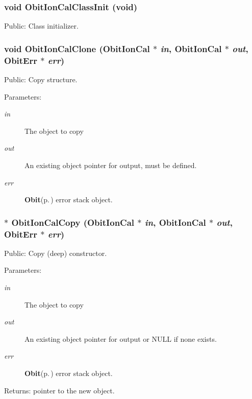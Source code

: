 \subsubsection{\setlength{\rightskip}{0pt plus 5cm}void Obit\-Ion\-Cal\-Class\-Init (void)}\label{ObitIonCal_8h_a4}


Public: Class initializer. 

\subsubsection{\setlength{\rightskip}{0pt plus 5cm}void Obit\-Ion\-Cal\-Clone ({\bf Obit\-Ion\-Cal} $\ast$ {\em in}, {\bf Obit\-Ion\-Cal} $\ast$ {\em out}, {\bf Obit\-Err} $\ast$ {\em err})}\label{ObitIonCal_8h_a9}


Public: Copy structure. 

\begin{Desc}
\item[Parameters:]
\begin{description}
\item[{\em in}]The object to copy \item[{\em out}]An existing object pointer for output, must be defined. \item[{\em err}]{\bf Obit}{\rm (p.\,\pageref{structObit})} error stack object. \end{description}
\end{Desc}
\subsubsection{$\ast$ Obit\-Ion\-Cal\-Copy ({\bf Obit\-Ion\-Cal} $\ast$ {\em in}, {\bf Obit\-Ion\-Cal} $\ast$ {\em out}, {\bf Obit\-Err} $\ast$ {\em err})}\label{ObitIonCal_8h_a8}


Public: Copy (deep) constructor. 

\begin{Desc}
\item[Parameters:]
\begin{description}
\item[{\em in}]The object to copy \item[{\em out}]An existing object pointer for output or NULL if none exists. \item[{\em err}]{\bf Obit}{\rm (p.\,\pageref{structObit})} error stack object. \end{description}
\end{Desc}
\begin{Desc}
\item[Returns:]pointer to the new object. \end{Desc}
